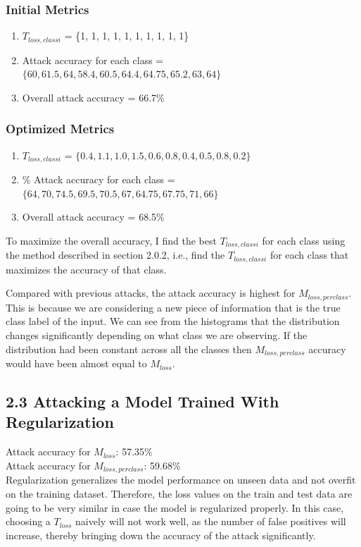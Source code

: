 \subsubsection{Initial Metrics}
\begin{enumerate}
    \item $T_{loss, class i}$ = \{1, 1, 1, 1, 1, 1, 1, 1, 1, 1\}
    \item Attack accuracy for each class = $\{60, 61.5, 64, 58.4, 60.5, 64.4, 64.75, 65.2, 63, 64\}$
    \item Overall attack accuracy = 66.7\%
\end{enumerate}

\subsubsection{Optimized Metrics}
\begin{enumerate}
    \item $T_{loss, class i}$ = $\{0.4, 1.1, 1.0, 1.5, 0.6, 0.8, 0.4, 0.5, 0.8, 0.2\}$
    \item \% Attack accuracy for each class = $\{64, 70, 74.5, 69.5, 70.5, 67, 64.75, 67.75, 71, 66\}$
    \item Overall attack accuracy = 68.5\%
\end{enumerate}

To maximize the overall accuracy, I find the best $T_{loss, class i}$ for each class using the method described in section 2.0.2, i.e., find the $T_{loss, class i}$ for each class that maximizes the accuracy of that class. 

Compared with previous attacks, the attack accuracy is highest for $M_{loss, per class}$. This is because we are considering a new
piece of information that is the true class label of the input. We can see from the histograms that the distribution changes significantly depending on what class we are observing. If the distribution had been constant across all the classes
then $M_{loss, per class}$ accuracy would have been almost equal to $M_{loss}$.

\subsection*{2.3 Attacking a Model Trained With Regularization}
Attack accuracy for $M_{loss}$: 57.35\% \\
Attack accuracy for $M_{loss, per class}$: 59.68\% \\

Regularization generalizes the model performance on unseen data and not overfit on the training dataset. Therefore, the loss values on the train and test data are going to be very similar in case the model is regularized properly. In this case, choosing a $T_{loss}$ naively will not work well, as the number of false positives will increase, thereby bringing down the accuracy of the attack significantly. 

